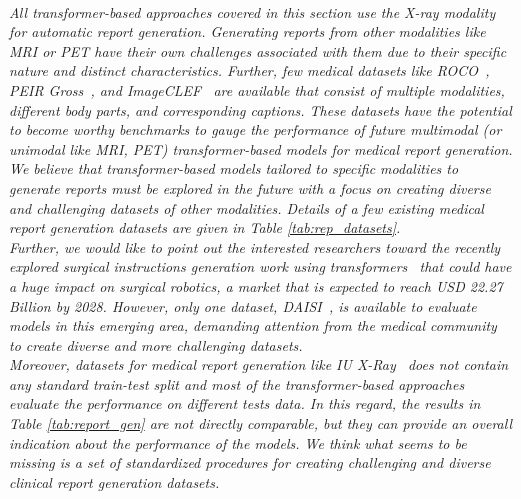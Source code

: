 \documentclass[10pt,journal,compsoc]{IEEEtran}
\begin{document}
\begin{tcolorbox}[top=0.5pt,left=0pt,size=minimal,boxrule = 0pt,breakable, enhanced]
\\
\vspace{0.01em}
\textit{ All transformer-based approaches covered in this section use the X-ray modality for automatic report generation. {Generating reports from other modalities like MRI or PET} have their own challenges associated with them due to their specific nature and distinct characteristics. Further, few medical datasets like ROCO~\cite{pelka2018radiology}, PEIR Gross~\cite{jing2017automatic}, and ImageCLEF~\cite{garcia2018overview} are available that consist of multiple modalities, different body parts, and corresponding captions. These datasets have the potential to become worthy benchmarks to gauge the performance of future multimodal (or unimodal like MRI, PET) transformer-based models for medical report generation. 
We believe that transformer-based models tailored to specific modalities to generate reports must be explored in the future with a focus on creating diverse and challenging datasets of other modalities. Details of a few existing medical report generation datasets are given in Table \ref{tab:rep_datasets}.
}
\\
\vspace{0.01em}
\textit{ Further, we would like to point out the interested researchers toward the recently explored {surgical instructions generation work using transformers}~\cite{zhang2021surgical} that could have a huge impact on surgical robotics, a market that is expected to reach USD 22.27 Billion by 2028. However, only one dataset, DAISI~\cite{rojas2020daisi}, is available to evaluate models in this emerging area, demanding attention from the medical community to create diverse and more challenging datasets. }
\\
\vspace{0.01em}
\textit{ Moreover, datasets for medical report generation like IU X-Ray~\cite{demner2016preparing} {does not contain any standard train-test split} and most of the transformer-based approaches evaluate the performance on different tests data. In this regard, the results in Table \ref{tab:report_gen} are not directly comparable, but they can provide an overall indication about the performance of the models.
We think what seems to be missing is a set of standardized procedures for creating challenging and diverse clinical report generation datasets.} %
\end{tcolorbox}
\end{document}

